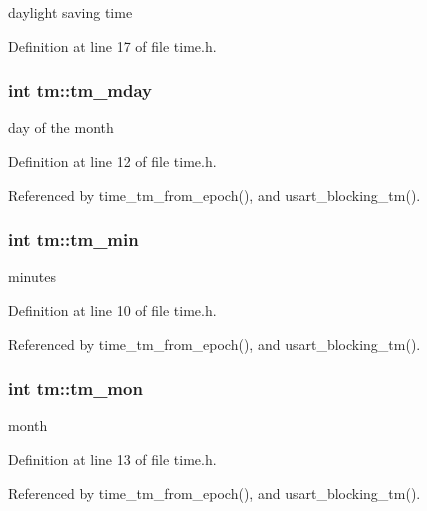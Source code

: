 daylight saving time 



Definition at line 17 of file time.\+h.

\hypertarget{structtm_ab8d8904bad43b0c8b96e61941c5b5310}{}
\subsubsection[{tm\+\_\+mday}]{\setlength{\rightskip}{0pt plus 5cm}int tm\+::tm\+\_\+mday}\label{structtm_ab8d8904bad43b0c8b96e61941c5b5310}


day of the month 



Definition at line 12 of file time.\+h.



Referenced by time\+\_\+tm\+\_\+from\+\_\+epoch(), and usart\+\_\+blocking\+\_\+tm().

\hypertarget{structtm_af414eb7c86cc3099595211eee4d4211b}{}
\subsubsection[{tm\+\_\+min}]{\setlength{\rightskip}{0pt plus 5cm}int tm\+::tm\+\_\+min}\label{structtm_af414eb7c86cc3099595211eee4d4211b}


minutes 



Definition at line 10 of file time.\+h.



Referenced by time\+\_\+tm\+\_\+from\+\_\+epoch(), and usart\+\_\+blocking\+\_\+tm().

\hypertarget{structtm_a112ac36fa2f593777138a417cf031e17}{}
\subsubsection[{tm\+\_\+mon}]{\setlength{\rightskip}{0pt plus 5cm}int tm\+::tm\+\_\+mon}\label{structtm_a112ac36fa2f593777138a417cf031e17}


month 



Definition at line 13 of file time.\+h.



Referenced by time\+\_\+tm\+\_\+from\+\_\+epoch(), and usart\+\_\+blocking\+\_\+tm().

